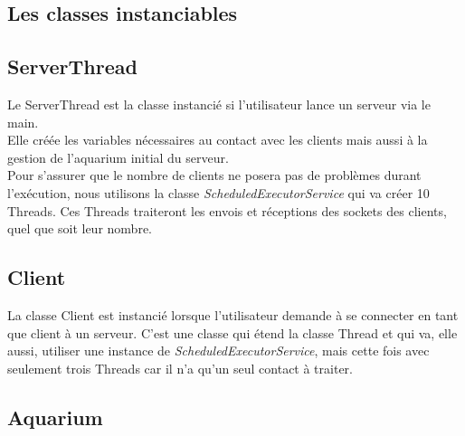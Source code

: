 \documentclass[a4paper, 12pt]{report}
\begin{document}
\begin{spacing}{1.3}
	\textcolor{colortitre2}{\subsection*{Les classes instanciables}}  	

		\textcolor{colortitre3}{\subsection*{ServerThread}}    

	Le ServerThread est la classe instancié si l'utilisateur lance un serveur via le main. \\
	Elle créée les variables nécessaires au contact avec les clients mais aussi à la gestion de l'aquarium initial du serveur. \\
	Pour s'assurer que le nombre de clients ne posera pas de problèmes durant l'exécution, nous utilisons la classe \textit{ScheduledExecutorService} qui va créer 10 Threads. Ces Threads traiteront les envois et réceptions des sockets des clients, quel que soit leur nombre. \\
	

		\textcolor{colortitre3}{\subsection*{Client}}    
	La classe Client est instancié lorsque l'utilisateur demande à se connecter en tant que client à un serveur. C'est une classe qui étend la classe Thread et qui va, elle aussi, utiliser une instance de \textit{ScheduledExecutorService}, mais cette fois avec seulement trois Threads car il n'a qu'un seul contact à traiter.
		
		\textcolor{colortitre3}{\subsection*{}}    
		
		
		\textcolor{colortitre3}{\subsection*{Aquarium}}    
\textcolor{colortitre1}{\section*{}} 


\end{spacing}
\end{document}

